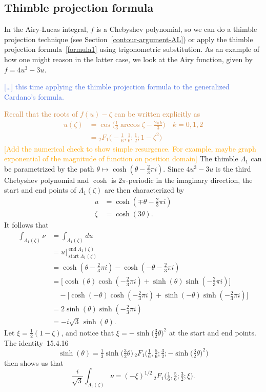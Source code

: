 \documentclass{article}
\theoremstyle{definition}
\theoremstyle{plain}
\begin{document}
{\subsection{Thimble projection formula}

In the Airy-Lucas integral, $f$ is a Chebyshev polynomial, so we can do a thimble projection technique (see Section~\ref{contour-argument-AL}) or apply the thimble projection formula~\eqref{formula1} using trigonometric substitution. As an example of how one might reason in the latter case, we look at the Airy function, given by $f = 4u^3-3u$.

\textcolor{RoyalBlue}{[\ldots] this time applying the thimble projection formula to the generalized Cardano's formula.}

\textcolor{Peru}{Recall that the roots of $f(u)-\zeta$ can be written explicitly as 
\begin{align*}
    u(\zeta)&=\cos\Big(\frac{1}{3}\arccos\zeta-\frac{2\pi k}{3}\Big) \quad k=0,1,2\\
    &={}_2F_1\Big(-\frac{1}{6},\frac{1}{6};\frac{1}{2};1-\zeta^2\Big)
\end{align*}}
\textcolor{orange}{[Add the numerical check to show simple resurgence. For example, maybe graph exponential of the magnitude of function on position domain]}
The thimble $\Lambda_1$ can be parametrized by the path $\theta \mapsto \cosh(\theta - \tfrac{2}{3}\pi i)$. Since $4u^3 - 3u$ is the third Chebyshev polynomial and $\cosh$ is $2\pi$-periodic in the imaginary direction, the start and end points of $\Lambda_1(\zeta)$ are then characterized by
\begin{align*}
u & = \cosh(\mp\theta - \tfrac{2}{3}\pi i) \\
\zeta & = \cosh(3\theta).
\end{align*}
It follows that
\begin{align*}
\int_{\Lambda_1(\zeta)} \nu & = \int_{\Lambda_1(\zeta)} du \\
& = u \Big|_{\operatorname{start} \Lambda_1(\zeta)}^{\operatorname{end} \Lambda_1(\zeta)}\\
 & = \cosh(\theta - \tfrac{2}{3}\pi i) - \cosh(-\theta - \tfrac{2}{3}\pi i) \\
& = \big[\cosh(\theta) \cosh(-\tfrac{2}{3}\pi i) + \sinh(\theta) \sinh(-\tfrac{2}{3}\pi i)\big] \\
& \quad - \big[\cosh(-\theta) \cosh(-\tfrac{2}{3}\pi i) + \sinh(-\theta) \sinh(-\tfrac{2}{3}\pi i)\big] \\
& = 2\sinh(\theta) \sinh(-\tfrac{2}{3}\pi i) \\
& = -i\sqrt{3}\,\sinh(\theta).
\end{align*}
Let $\xi = \tfrac{1}{2}(1 - \zeta)$, and notice that $\xi = -\sinh\big(\tfrac{3}{2} \theta\big)^2$ at the start and end points. The identity~15.4.16 \cite{dlmf}
\[ \sinh( \theta) = \tfrac{1}{3} \sinh\big( \tfrac{3}{2}\theta\big)\,{}_2F_1\big(\tfrac{1}{6}, \tfrac{5}{6}; \tfrac{3}{2}; -\sinh\big(\tfrac{3}{2}\theta\big)^2\big) \]
then shows us that
\[ \frac{i}{\sqrt{3}} \int_{\Lambda_1(\zeta)} \nu = (-\xi)^{1/2}\,{}_2F_1\big(\tfrac{1}{6}, \tfrac{5}{6}; \tfrac{3}{2}; \xi\big). \]

}
\end{document}
